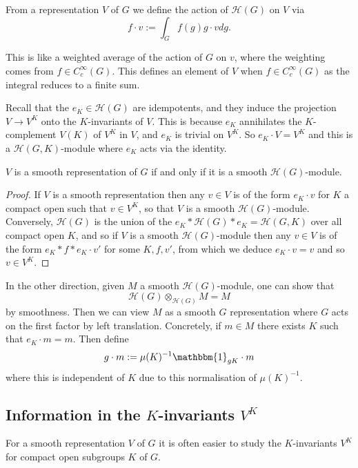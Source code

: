\begin{defn}
From a representation $V$ of $G$ we define the action of $\mathcal H(G)$ on $V$ via 
$$f \cdot v := \int_G f(g) g \cdot v dg.$$
\end{defn}
This is like a weighted average of the action of $G$ on $v$, where the weighting comes from $f \in C_c^\infty(G)$. This defines an element of $V$ when $f \in C_c^\infty(G)$ as the integral reduces to a finite sum.


Recall that the $e_K \in \mathcal H(G)$ are idempotents, and they induce the projection $V \to V^K$ onto the $K$-invariants of $V$. This is because $e_K$ annihilates the $K$-complement $V(K)$ of $V^K$ in $V$, and $e_K$ is trivial on $V^K$. So $e_K \cdot V=V^K$ and this is a $\mathcal H(G,K)$-module where $e_K$ acts via the identity.

\begin{prop}
    $V$ is a smooth representation of $G$ if and only if it is a smooth $\mathcal H(G)$-module.
\end{prop}
\begin{proof}
If $V$ is a smooth representation then any $v \in V$ is of the form $e_K \cdot v$ for $K$ a compact open such that $v \in V^K$, so that $V$ is a smooth $\mathcal H(G)$-module. Conversely, $\mathcal H(G)$ is the union of the $e_K* \mathcal H(G) *e_K = \mathcal H(G,K)$ over all compact open $K$, and so if $V$ is a smooth $\mathcal H(G)$-module then any $v \in V$ is of the form $e_K * f * e_K \cdot v'$ for some $K, f, v'$, from which we deduce $e_K \cdot v=v$ and so $v \in V^K$.
\end{proof}

In the other direction, given $M$ a smooth $\mathcal H(G)$-module, one can show that $$\mathcal H(G) \otimes_{\mathcal H(G)} M = M$$ by smoothness. Then we can view $M$ as a smooth $G$ representation where $G$ acts on the first factor by left translation. Concretely, if $m \in M$ there exists $K$ such that $e_K \cdot m = m$. Then define $$g \cdot m := \mu(K)^{-1} \mathbbm{1}_{gK} \cdot m$$ where this is independent of $K$ due to this normalisation of $\mu(K)^{-1}$.

\subsection{Information in the $K$-invariants $V^K$}
For a smooth representation $V$ of $G$ it is often easier to study the $K$-invariants $V^K$ for compact open subgroups $K$ of $G$.

